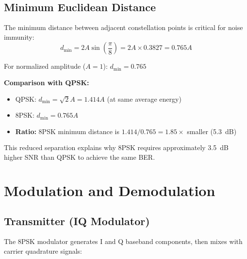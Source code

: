 \subsection{Minimum Euclidean Distance}

The minimum distance between adjacent constellation points is critical for noise immunity:
\begin{equation}
d_{\min} = 2A\sin\left(\frac{\pi}{8}\right) = 2A \times 0.3827 = 0.765A
\end{equation}

For normalized amplitude ($A = 1$): $d_{\min} = 0.765$

\textbf{Comparison with QPSK:}
\begin{itemize}
\item QPSK: $d_{\min} = \sqrt{2}A = 1.414A$ (at same average energy)
\item 8PSK: $d_{\min} = 0.765A$
\item \textbf{Ratio:} 8PSK minimum distance is $1.414/0.765 = 1.85\times$ smaller (5.3~dB)
\end{itemize}

This reduced separation explains why 8PSK requires approximately 3.5~dB higher SNR than QPSK to achieve the same BER.

\section{Modulation and Demodulation}

\subsection{Transmitter (IQ Modulator)}

The 8PSK modulator generates I and Q baseband components, then mixes with carrier quadrature signals:

